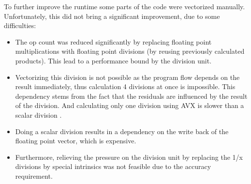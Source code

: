 To further improve the runtime some parts of the code were vectorized manually. Unfortunately, this did not bring a significant improvement, due to some difficulties:
\begin{itemize}
	\item The op count was reduced significantly by replacing floating point multiplications with floating point divisions (by reusing previously calculated products). This lead to a performance bound by the division unit.
	\item Vectorizing this division is not possible as the program flow depends on the result immediately, thus calculation 4 divisions at once is impossible. This dependency stems from the fact that the residuals are influenced by the result of the division. And calculating only one division using AVX is slower than a scalar division \cite{intrinsics_guide}.
	\item Doing a scalar division results in a dependency on the write back of the floating point vector, which is expensive.
	\item Furthermore, relieving the pressure on the division unit by replacing the 1/x divisions by special intrinsics was not feasible due to the accuracy requirement.
\end{itemize}